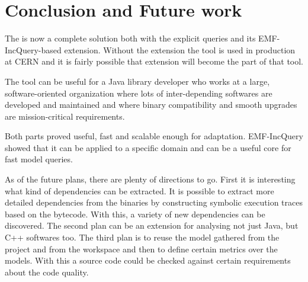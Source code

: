 \chapter{Conclusion and Future work}

The \ptool{} is now a complete solution both with the explicit queries and its
EMF-IncQuery-based extension. Without the extension the tool is used in
production at CERN and it is fairly possible that extension will become the part
of that tool.

The tool can be useful for a Java library developer who works at a large,
software-oriented organization where lots of inter-depending softwares are
developed and maintained and where binary compatibility and smooth upgrades are
mission-critical requirements.

Both parts proved useful, fast and scalable enough for adaptation. EMF-IncQuery 
showed that it can be applied to a specific domain and can be a useful core
for fast model queries. 

As of the future plans, there are plenty of directions to go.
First it is interesting what kind of dependencies can be extracted.
It is possible to extract more detailed dependencies from the binaries by
constructing symbolic execution traces based on the bytecode. With this, a
variety of new dependencies can be discovered. The second plan can be an
extension for analysing not just Java, but C++ softwares too. The third plan is
to reuse the model gathered from the project and from the workspace and then to
define certain metrics over the models. With this a source code could be
checked against certain requirements about the code quality.